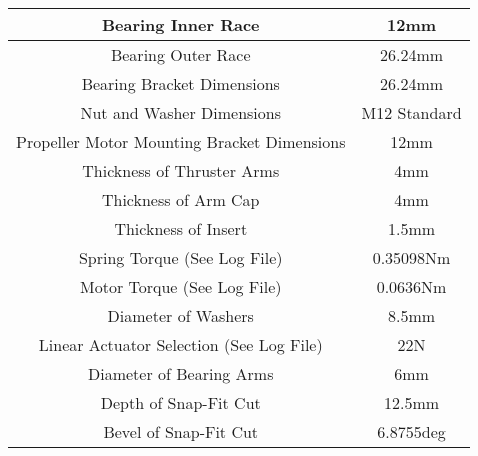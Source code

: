 \documentclass[../main.tex]{subfiles}
\begin{document}
\begin{table}[H]
\begin{tabular}{|c|c|}
		Bearing Inner Race                                                &  12mm                     \\ \hline
		Bearing Outer Race                                                &  26.24mm                   \\ \hline
		Bearing Bracket Dimensions                                        &  26.24mm					  \\ \hline
		Nut and Washer Dimensions                                         &  M12 Standard                     \\ \hline
		Propeller Motor Mounting Bracket Dimensions                       &  12mm                     \\ \hline
		Thickness of Thruster Arms                                        &  4mm                     \\ \hline
		Thickness of Arm Cap                                              &  4mm                     \\ \hline
		Thickness of Insert                                               &  1.5mm                     \\ \hline
		Spring Torque (See Log File)                                      &  0.35098Nm                     \\ \hline
		Motor Torque (See Log File)                                       &  0.0636Nm                     \\ \hline
		Diameter of Washers                                               &  8.5mm                     \\ \hline
		Linear Actuator Selection (See Log File)                          &  22N                     \\ \hline
		Diameter of Bearing Arms                                          &  6mm                     \\ \hline
		Depth of Snap-Fit Cut                                             &  12.5mm                      \\ \hline
		Bevel of Snap-Fit Cut                                             &  6.8755deg                     \\ \hline
	\end{tabular}
\end{table}
\end{document}
